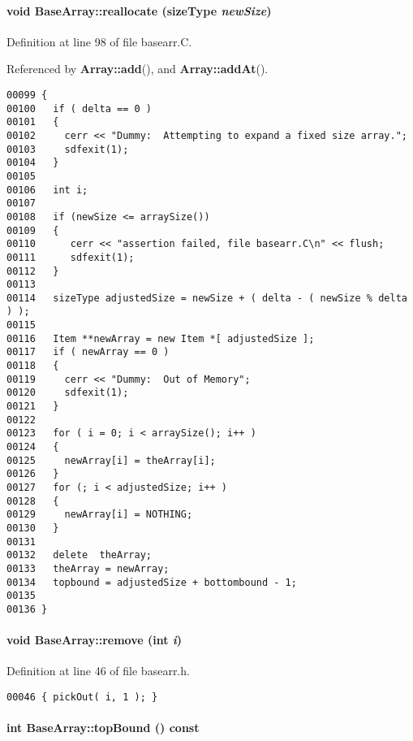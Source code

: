 \paragraph{\setlength{\rightskip}{0pt plus 5cm}void Base\-Array::reallocate ({\bf size\-Type} {\em new\-Size})\hspace{0.3cm}{\tt  [protected]}}\hfill



Definition at line 98 of file basearr.C.

Referenced by {\bf Array::add}(), and {\bf Array::add\-At}().\small\begin{verbatim}00099 {
00100   if ( delta == 0 )
00101   {
00102     cerr << "Dummy:  Attempting to expand a fixed size array.";
00103     sdfexit(1);
00104   }
00105   
00106   int i;        
00107   
00108   if (newSize <= arraySize())
00109   {
00110      cerr << "assertion failed, file basearr.C\n" << flush;
00111      sdfexit(1);
00112   }
00113 
00114   sizeType adjustedSize = newSize + ( delta - ( newSize % delta ) );
00115   
00116   Item **newArray = new Item *[ adjustedSize ];
00117   if ( newArray == 0 )
00118   {
00119     cerr << "Dummy:  Out of Memory";
00120     sdfexit(1);
00121   }
00122   
00123   for ( i = 0; i < arraySize(); i++ )
00124   {
00125     newArray[i] = theArray[i];
00126   }
00127   for (; i < adjustedSize; i++ )
00128   {
00129     newArray[i] = NOTHING;
00130   }
00131   
00132   delete  theArray;
00133   theArray = newArray;
00134   topbound = adjustedSize + bottombound - 1;
00135   
00136 }
\end{verbatim}\normalsize 
\label{BaseArray_a7}
\paragraph{\setlength{\rightskip}{0pt plus 5cm}void Base\-Array::remove (int {\em i})\hspace{0.3cm}{\tt  [inline]}}\hfill



Definition at line 46 of file basearr.h.\small\begin{verbatim}00046 { pickOut( i, 1 ); }
\end{verbatim}\normalsize 
\label{BaseArray_a3}
\paragraph{\setlength{\rightskip}{0pt plus 5cm}int Base\-Array::top\-Bound () const\hspace{0.3cm}{\tt  [inline]}}\hfill




